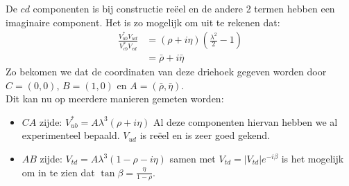 \documentclass[../main.tex]{subfiles}
\begin{document}
De $cd$ componenten is bij constructie reëel en de andere 2 termen hebben een imaginaire component. Het is zo mogelijk om uit te rekenen dat:
\begin{equation}
    \begin{aligned}
        \label{eq:driehoeksvoorstelling_mat_vermenigvuldiging}
        \frac{V_{u b}^{*} V_{u d}}{V_{c b}^{*} V_{c d}} &=(\rho+i \eta)\left(\frac{\lambda^{2}}{2}-1\right) \\
                                                        &=\bar{\rho}+i \bar{\eta}
    \end{aligned}
\end{equation}
Zo bekomen we dat de coordinaten van deze driehoek gegeven worden door $C=(0,0)$, $B=(1,0)$ en $A=(\bar{\rho}, \bar{\eta})$.\\
Dit kan nu op meerdere manieren gemeten worden:
\begin{itemize}
    \item $CA$ zijde: $V_{u b}^{*}=A \lambda^{3}(\rho+i \eta)$ Al deze componenten hiervan hebben we al experimenteel bepaald. $V_{ud}$ is reëel en is zeer goed gekend.
    \item $AB$ zijde: $V_{t d}=A \lambda^{3}(1-\rho-i \eta)$ samen met $V_{t d}=\left|V_{t d}\right| e^{-i \beta}$ is het mogelijk om in te zien dat $\tan \beta=\frac{\eta}{1-\rho}$.
\end{itemize}
\end{document}
